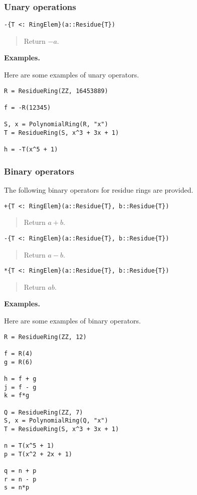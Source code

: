 \documentclass[a4paper,10pt]{article}
\newcommand{\desc}[1]{\vspace{-3mm}\begin{quote}#1\end{quote}}
\begin{document}
\subsubsection{Unary operations}

\begin{lstlisting}
-{T <: RingElem}(a::Residue{T})
\end{lstlisting}

\desc{Return $-a$.}

\textbf{Examples.}

Here are some examples of unary operators.

\begin{lstlisting}
R = ResidueRing(ZZ, 16453889)

f = -R(12345)

S, x = PolynomialRing(R, "x")
T = ResidueRing(S, x^3 + 3x + 1)

h = -T(x^5 + 1)
\end{lstlisting}

\subsubsection{Binary operators}

The following binary operators for residue rings are provided.

\begin{lstlisting}
+{T <: RingElem}(a::Residue{T}, b::Residue{T})
\end{lstlisting}

\desc{Return $a + b$.}

\begin{lstlisting}
-{T <: RingElem}(a::Residue{T}, b::Residue{T})
\end{lstlisting}

\desc{Return $a - b$.}

\begin{lstlisting}
*{T <: RingElem}(a::Residue{T}, b::Residue{T})
\end{lstlisting}

\desc{Return $ab$.}

\textbf{Examples.}

Here are some examples of binary operators.

\begin{lstlisting}
R = ResidueRing(ZZ, 12)

f = R(4)
g = R(6)

h = f + g
j = f - g
k = f*g

Q = ResidueRing(ZZ, 7)
S, x = PolynomialRing(Q, "x")
T = ResidueRing(S, x^3 + 3x + 1)

n = T(x^5 + 1)
p = T(x^2 + 2x + 1)

q = n + p
r = n - p
s = n*p
\end{lstlisting}
\end{document}
